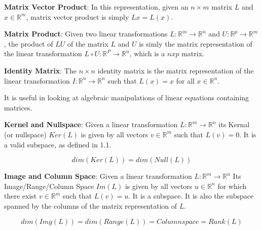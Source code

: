 \documentclass[12pt]{article}
\newenvironment{definition}[2][Definition]{\begin{trivlist}
\item[\hskip \labelsep {\bfseries #1}\hskip \labelsep {\bfseries #2}]}{\end{trivlist}}
\begin{document}
\begin{definition}{1.8} \textbf{Matrix Vector Product}: In this representation, given an \(n \times m\) matrix $L$ and \(x \in \mathbb{R}^m\), matrix vector product is simply \(Lx = L(x)\).
\end{definition}

\begin{definition}{1.9} \textbf{Matrix Product}: Given two linear transformations \(L:\mathbb{R}^m \rightarrow \mathbb{R}^n\) and \(U: \mathbb{R}^p \rightarrow \mathbb{R}^m\), the product of $LU$ of the matrix $L$ and $U$ is simly the matrix representation of the linear transformation \(L\circ U : \mathbb{R}^P \rightarrow \mathbb{R}^n\), which is a $n x p$ matrix.
\end{definition}

\begin{definition}{1.10} \textbf{Identity Matrix}: The \(n \times n\) identity matrix is the matrix representation of the linear transformation \(I: \mathbb{R}^n \rightarrow \mathbb{R}^n\) such that \(L(x) = x\) for all \(x \in \mathbb{R}^n\).

\bigskip
\noindent
It is useful in looking at algebraic manipulations of linear equations containing matrices.
\end{definition}

\begin{definition}{1.11} \textbf{Kernel and Nullspace}: Given a linear transformation \(L:\mathbb{R}^m \rightarrow \mathbb{R}^n\) its Kernal (or nullspace) $Ker(L)$ is given by all vectors \(v \in \mathbb{R}^m \) such that \(L(v) = 0\). It is a valid subspace, as defined in 1.1.

\[dim(Ker(L)) = dim(Null(L))\]
\end{definition}

\begin{definition}{1.12} \textbf{Image and Column Space}: Given a linear transformation \(L:\mathbb{R}^m \rightarrow \mathbb{R}^n\) 
Its Image/Range/Column Space $Im(L)$ is given by all vectors \(u \in \mathbb{R}^n\) for which there exist \(v \in \mathbb{R}^m\) such that \(L(v) = u\). It is a subspace. It is also the subspace spanned by the columns of the matrix representation of $L$.

\[dim(Img(L)) = dim(Range(L)) = Columnspace = Rank(L)\]
\end{definition}
\end{document}
